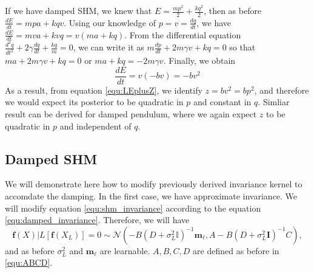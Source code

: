 \documentclass{statsmsc}
\begin{document}
If we have damped SHM, we knew that $E=\frac{mp^2}{2}+\frac{kq^2}{2}$, then as before $\frac{dE}{dt}=mpa+kqv$.
Using our knowledge of $p=v=\frac{dq}{dt}$, we have $\frac{dE}{dt}=mva+kvq=v(ma+kq)$.
From the differential equation $\frac{d^2q}{dt^2}+2\gamma \frac{dq}{dt} +\frac{kq}{m}=0$, we can write it as $m\frac{dp}{dt}+2m\gamma v + kq=0$ so that $ma+2m\gamma v+kq=0$ or $ma+kq=-2m\gamma v$.
Finally, we obtain
$$
\frac{dE}{dt} = v(-bv) = -bv^2
$$
As a result, from equation \ref{equ:LEplusZ}, we identify $z=bv^2=bp^2$, and therefore we would expect its posterior to be quadratic in $p$ and constant in $q$.
Simliar result can be derived for damped pendulum, where we again expect $z$ to be quadratic in $p$ and independent of $q$.

\subsection{Damped SHM}
We will demonstrate here how to modify previously derived invariance kernel to accomdate the damping.
In the first case, we have approximate invariance.
We will modify equation \ref{equ:shm_invariance} according to the equation \ref{equ:damped_invariance}.
Therefore, we will have
$$
\mathbf{f}(X)|L[\mathbf{f}(X_L)]=0\sim\mathcal{N}(-B(D+\sigma^2_L\mathbb{I})^{-1}\mathbf{m}_\ell,A-B(D+\sigma^2_L\mathbf{I})^{-1}C),
$$
and as before $\sigma_L^2$ and $\mathbf{m}_\ell$ are learnable.
$A, B, C, D$ are defined as before in \ref{equ:ABCD}.
\end{document}
